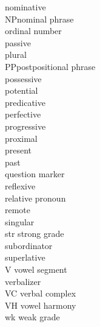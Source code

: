 \begin{multicols}{2}
\begin{tabbing}
	\> nominative \\
NP\>nominal phrase\\
	\> ordinal number \\
	\> passive \\
	\> plural \\
PP\>postpositional phrase\\
	\> possessive \\
	\> potential \\
 \> predicative\\
	\> perfective \\
	\> progressive \\
	\> proximal \\
	\> present \\
	\> past \\
	\> question marker \\
	\> reflexive\\
	\> relative pronoun \\
	\> remote \\
	\> singular \\
str		\>strong grade \\%
\> subordinator \\
\> superlative \\
V		\>vowel segment\\
	\> verbalizer \\
VC		\>verbal complex\\
VH		\>vowel harmony\\
wk		\>weak grade \\%
\end{tabbing}
\end{multicols}

%